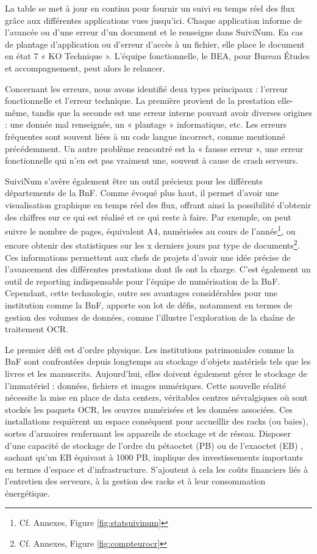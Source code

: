 \documentclass[a4paper,12pt,twoside]{book}
\begin{document}
	La table se met à jour en continu pour fournir un suivi en temps réel des flux grâce aux différentes applications vues jusqu'ici. Chaque application informe de l'avancée ou d'une erreur d'un document et le renseigne dans SuiviNum. En cas de plantage d'application ou d'erreur d'accès à un fichier, elle place le document en état 7 « KO Technique ». L'équipe fonctionnelle, le BEA, pour Bureau Études et accompagnement, peut alors le relancer.
	
	Concernant les erreurs, nous avons identifié deux types principaux : l'erreur fonctionnelle et l'erreur technique. La première provient de la prestation elle-même, tandis que la seconde est une erreur interne pouvant avoir diverses origines : une donnée mal renseignée, un « plantage » informatique, etc. Les erreurs fréquentes sont souvent liées à un code langue incorrect, comme mentionné précédemment. Un autre problème rencontré est la « fausse erreur », une erreur fonctionnelle qui n'en est pas vraiment une, souvent à cause de crash serveurs. 
	
	SuiviNum s'avère également être un outil précieux pour les différents départements de la BnF. Comme évoqué plus haut, il permet d'avoir une visualisation graphique en temps réel des flux, offrant ainsi la possibilité d'obtenir des chiffres sur ce qui est réalisé et ce qui reste à faire. Par exemple, on peut suivre le nombre de pages, équivalent A4, numérisées au cours de l'année\footnote{Cf. Annexes, Figure \ref{fig:statsuivinum}}, ou encore obtenir des statistiques sur les x derniers jours par type de documents\footnote{Cf. Annexes, Figure \ref{fig:compteurocr}}. Ces informations permettent aux chefs de projets d'avoir une idée précise de l'avancement des différentes prestations dont ils ont la charge. C'est également un outil de reporting indispensable pour l'équipe de numérisation de la BnF.
	\\
	
	Cependant, cette technologie, outre ses avantages considérables pour une institution comme la BnF, apporte son lot de défis, notamment en termes de gestion des volumes de données, comme l'illustre l'exploration de la chaîne de traitement OCR.
	
	Le premier défi est d'ordre physique. Les institutions patrimoniales comme la BnF sont confrontées depuis longtemps au stockage d'objets matériels tels que les livres et les manuscrits. Aujourd'hui, elles doivent également gérer le stockage de l'immatériel : données, fichiers et images numériques. Cette nouvelle réalité nécessite la mise en place de data centers, véritables centres névralgiques où sont stockés les paquets OCR, les œuvres numérisées et les données associées. Ces installations requièrent un espace conséquent pour accueillir des racks (ou baies), sortes d'armoires renfermant les appareils de stockage et de réseau. Disposer d'une capacité de stockage de l'ordre du pétaoctet (PB) ou de l'exaoctet (EB) , sachant qu'un EB équivaut à 1000 PB, implique des investissements importants en termes d'espace et d'infrastructure. S'ajoutent à cela les coûts financiers liés à l'entretien des serveurs, à la gestion des racks et à leur consommation énergétique.
	
\end{document}
